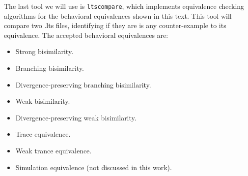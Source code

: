 \documentclass[11pt]{article}
\theoremstyle{definition}
\theoremstyle{plain}
\begin{document}
The last tool we will use is \texttt{ltscompare}, which implements equivalence checking algorithms for the behavioral equivalences shown in this text. This tool will compare two .lts files, identifying if they are is any counter-example to its equivalence. The accepted behavioral equivalences are:

\begin{itemize}
	\item Strong bisimilarity.
	\item Branching bisimilarity.
	\item Divergence-preserving branching bisimilarity.
	\item Weak bisimilarity.
	\item Divergence-preserving weak bisimilarity.
	\item Trace equivalence.
	\item Weak trance equivalence.
	\item Simulation equivalence (not discussed in this work).
\end{itemize}
\end{document}
